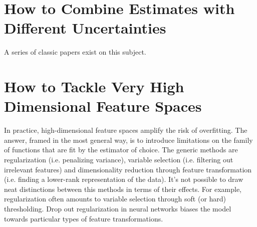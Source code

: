 \section{How to Combine Estimates with Different Uncertainties}
A series of classic papers exist on this subject.  


\section{How to Tackle Very High Dimensional Feature Spaces}
In practice, high-dimensional feature spaces amplify the risk of overfitting. The answer, framed in the most general way, is to introduce limitations on the family of functions that are fit by the estimator of choice. The generic methods are regularization (i.e. penalizing variance), variable selection (i.e. filtering out irrelevant features) and dimensionality reduction through feature transformation (i.e. finding a lower-rank representation of the data). It's not possible to draw neat distinctions between this methods in terms of their effects. For example, regularization often amounts to variable selection through soft (or hard) thresholding. Drop out regularization in neural networks biases the model towards particular types of feature transformations.



